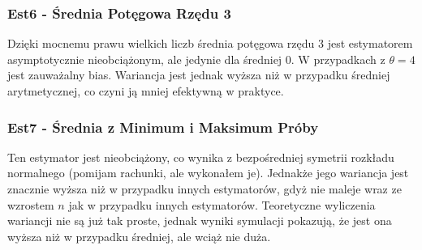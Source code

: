 \documentclass[a4paper,12pt]{article}
\begin{document}
\subsubsection{Est6 - Średnia Potęgowa Rzędu 3}
Dzięki mocnemu prawu wielkich liczb średnia potęgowa rzędu 3 jest estymatorem asymptotycznie nieobciążonym, ale jedynie dla średniej 0.
W przypadkach z $\theta = 4$ jest zauważalny bias.
Wariancja jest jednak wyższa niż w przypadku średniej arytmetycznej, co czyni ją mniej efektywną w praktyce.

\subsubsection{Est7 - Średnia z Minimum i Maksimum Próby}
Ten estymator jest nieobciążony, co wynika z bezpośredniej symetrii rozkładu normalnego (pomijam rachunki, ale wykonałem je).
Jednakże jego wariancja jest znacznie wyższa niż w przypadku innych estymatorów, gdyż nie maleje wraz ze wzrostem $n$ jak w przypadku innych estymatorów.
Teoretyczne wyliczenia wariancji nie są już tak proste, jednak wyniki symulacji pokazują, że jest ona wyższa niż w przypadku średniej, ale wciąż nie duża.
\end{document}
